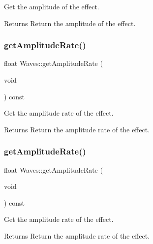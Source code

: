 Get the amplitude of the effect. 

\begin{DoxyReturn}{Returns}
Return the amplitude of the effect. 
\end{DoxyReturn}
\mbox{\label{classWaves_a5271ab00aa35799011e605b51949c8b7}} 
\subsubsection{\texorpdfstring{get\+Amplitude\+Rate()}{getAmplitudeRate()}\hspace{0.1cm}{\footnotesize\ttfamily [1/2]}}
{\footnotesize\ttfamily float Waves\+::get\+Amplitude\+Rate (\begin{DoxyParamCaption}\item[{void}]{ }\end{DoxyParamCaption}) const\hspace{0.3cm}{\ttfamily [inline]}}



Get the amplitude rate of the effect. 

\begin{DoxyReturn}{Returns}
Return the amplitude rate of the effect. 
\end{DoxyReturn}
\mbox{\label{classWaves_a5271ab00aa35799011e605b51949c8b7}} 
\subsubsection{\texorpdfstring{get\+Amplitude\+Rate()}{getAmplitudeRate()}\hspace{0.1cm}{\footnotesize\ttfamily [2/2]}}
{\footnotesize\ttfamily float Waves\+::get\+Amplitude\+Rate (\begin{DoxyParamCaption}\item[{void}]{ }\end{DoxyParamCaption}) const\hspace{0.3cm}{\ttfamily [inline]}}



Get the amplitude rate of the effect. 

\begin{DoxyReturn}{Returns}
Return the amplitude rate of the effect. 
\end{DoxyReturn}
\mbox{\label{classWaves_a65150f197db5932cdc1fc48fcec6fb4f}} 
